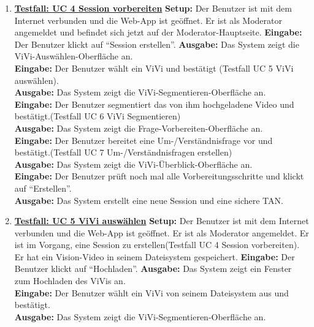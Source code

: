 \begin{enumerate}
	\item \underline{\textbf{Testfall: UC 4 Session vorbereiten}} \linebreak
	\textbf{Setup:} Der Benutzer ist mit dem Internet verbunden und die Web-App ist geöffnet. Er ist als Moderator angemeldet und befindet sich jetzt auf der Moderator-Hauptseite.\linebreak
	\textbf{Eingabe:} Der Benutzer klickt auf ``Session erstellen''.\linebreak
	\textbf{Ausgabe:} Das System zeigt die ViVi-Auswählen-Oberfläche an. \\
	\textbf{Eingabe:} Der Benutzer wählt ein ViVi und bestätigt (Testfall UC 5 ViVi auswählen).\\
	\textbf{Ausgabe:} Das System zeigt die ViVi-Segmentieren-Oberfläche an. \\
	\textbf{Eingabe:} Der Benutzer segmentiert das von ihm hochgeladene Video und bestätigt.(Testfall UC 6 ViVi Segmentieren)\\
	\textbf{Ausgabe:} Das System zeigt die Frage-Vorbereiten-Oberfläche an.\\
	\textbf{Eingabe:} Der Benutzer bereitet eine Um-/Verständnisfrage vor und bestätigt.(Testfall UC 7 Um-/Verständnisfragen erstellen)\\
	\textbf{Ausgabe:} Das System zeigt die ViVi-Überblick-Oberfläche an.\\
	\textbf{Eingabe:} Der Benutzer prüft noch mal alle Vorbereitungsschritte und klickt auf ``Erstellen''.\\
	\textbf{Ausgabe:} Das System erstellt eine neue Session und eine sichere TAN.
	
	\item \underline{\textbf{Testfall: UC 5 ViVi auswählen}} \linebreak
	\textbf{Setup:} Der Benutzer ist mit dem Internet verbunden und die Web-App ist geöffnet. Er ist als Moderator angemeldet. Er ist im Vorgang, eine Session zu erstellen(Testfall UC 4 Session vorbereiten). Er hat ein Vision-Video in seinem Dateisystem gespeichert. \linebreak
	\textbf{Eingabe:} Der Benutzer klickt auf ``Hochladen''. \linebreak
	\textbf{Ausgabe:} Das System zeigt ein Fenster zum Hochladen des ViVis an.\\
	\textbf{Eingabe:} Der Benutzer wählt ein ViVi von seinem Dateisystem aus und bestätigt.\\
	\textbf{Ausgabe:} Das System zeigt die ViVi-Segmentieren-Oberfläche an.
	

\end{enumerate}
